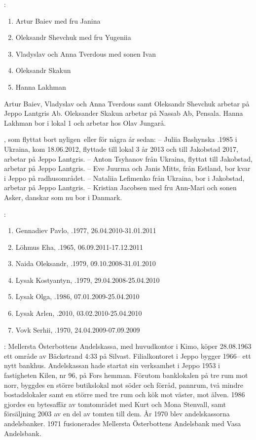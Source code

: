 :
\begin{enumerate}
  \item Artur Baiev med fru Janina
  \item Oleksandr Shevchuk med fru Yugeniia
  \item Vladyslav och Anna Tverdous med sonen Ivan
  \item Oleksandr Skakun
  \item Hanna Lakhman
\end{enumerate}
Artur Baiev, Vladyslav och Anna Tverdous samt Oleksandr Shevchuk arbetar på Jeppo Lantgris Ab. Oleksander Skakun arbetar på Nassab Ab, Pensala. Hanna Lakhman bor i lokal 1 och arbetar hos Olav Jungarå.


, som flyttat bort nyligen eller för några år sedan:
-- Juliia Bashynska .1985 i Ukraina, kom 18.06.2012, flyttade till lokal 3 år 2013 och till Jakobstad 2017, arbetar på Jeppo Lantgris.
-- Anton Tsyhanov från Ukraina, flyttat till Jakobstad, arbetar på Jeppo Lantgris.
-- Eve Juurma och Janis Mitts, från  Estland, bor kvar i Jeppo på radhusområdet.
-- Nataliia Lefimenko från Ukraina, bor i Jakobstad, arbetar på Jeppo Lantgris.
-- Kristian Jacobsen med fru Ann-Mari och sonen Asker, danskar som nu bor i Danmark.


:
\begin{enumerate}
  \item Gennadiev Pavlo,  .1977,    26.04.2010-31.01.2011
  \item Löhmus Eha,       .1965,    06.09.2011-17.12.2011
  \item Naida Oleksandr,  .1979,    09.10.2008-31.01.2010
  \item Lysak Kostyantyn, .1979,    29.04.2008-25.04.2010
  \item Lysak Olga,       .1986,    07.01.2009-25.04.2010
  \item Lysak Arlen,      .2010,    03.02.2010-25.04.2010
  \item Vovk Serhii,      .1970,    24.04.2009-07.09.2009
\end{enumerate}


:
Mellersta Österbottens Andelskassa, med huvudkontor i Kimo, köper 28.08.1963 ett område av Bäckstrand 4:33 på Silvast. Filialkontoret i Jeppo bygger 1966-- ett nytt bankhus. Andelskassan hade startat sin verksamhet i Jeppo 1953 i fastigheten Kilen, nr 96, på Fors hemman.	Förutom banklokalen på tre rum mot norr, byggdes en större butikslokal mot söder och förråd, pannrum, två mindre bostadslokaler samt en större med tre rum och kök mot väster, mot älven. 1986 gjordes en bytesaffär av tomtområdet med Kurt och Mona Stenvall, samt	försäljning 2003 av en del av tomten till dem. År 1970 blev andelskassorna andelsbanker. 1971 fusionerades Mellersta Österbottens Andelsbank med Vasa Andelsbank.

